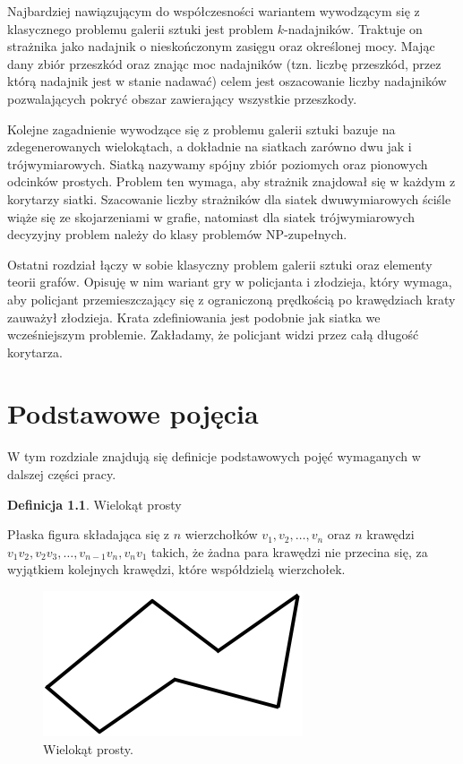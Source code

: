 \documentclass[brudnopis]{xmgr}
\theoremstyle{definition}
\newtheorem{Definicja}{Definicja}
\begin{document}
Najbardziej nawiązującym do współczesności wariantem wywodzącym się z klasycznego problemu galerii sztuki jest problem $k$-nadajników. Traktuje on strażnika jako nadajnik o nieskończonym zasięgu oraz określonej mocy. Mając dany zbiór przeszkód oraz znając moc nadajników (tzn. liczbę przeszkód, przez którą nadajnik jest w stanie nadawać) celem jest oszacowanie liczby nadajników pozwalających pokryć obszar zawierający wszystkie przeszkody.

Kolejne zagadnienie wywodzące się z problemu galerii sztuki bazuje na zdegenerowanych wielokątach, a dokładnie na siatkach zarówno dwu jak i trójwymiarowych. Siatką nazywamy spójny zbiór poziomych oraz pionowych odcinków prostych. Problem ten wymaga, aby strażnik znajdował się w każdym z korytarzy siatki. Szacowanie liczby strażników dla siatek dwuwymiarowych ściśle wiąże się ze skojarzeniami w grafie, natomiast dla siatek trójwymiarowych decyzyjny problem należy do klasy problemów NP-zupełnych.

Ostatni rozdział łączy w sobie klasyczny problem galerii sztuki oraz elementy teorii grafów. Opisuję w nim wariant gry w policjanta i złodzieja, który wymaga, aby policjant przemieszczający się z ograniczoną prędkością po krawędziach kraty zauważył złodzieja. Krata zdefiniowania jest podobnie jak siatka we wcześniejszym problemie. Zakładamy, że policjant widzi przez całą długość korytarza.


\chapter{Podstawowe pojęcia}
W tym rozdziale znajdują się definicje podstawowych pojęć wymaganych w dalszej części pracy.

\begin{Definicja}{Wielokąt prosty}

  Płaska figura składająca się z $n$ wierzchołków $v_1, v_2,\ldots, v_n$ oraz $n$ krawędzi $v_1v_2, v_2v_3, \ldots, v_{n-1}v_n,v_nv_1$ takich, że żadna para krawędzi nie przecina się, za wyjątkiem kolejnych krawędzi, które współdzielą wierzchołek.
\end{Definicja}

\begin{figure}[ht!]
  \centering
  \includegraphics{rysunki/wielokat_prosty.png}
    \caption{Wielokąt prosty.}
\end{figure} 
\end{document}
